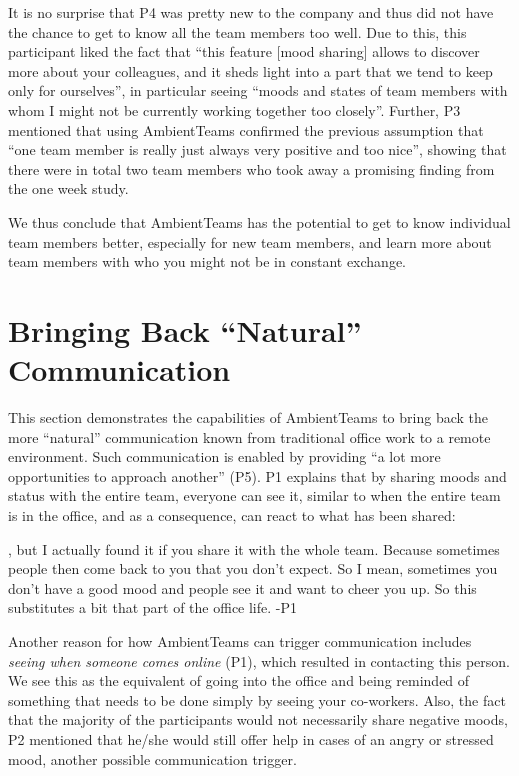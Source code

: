 It is no surprise that P4 was pretty new to the company and thus did not have the chance to get to know all the team members too well. Due to this, this participant liked the fact that \enquote{this feature [mood sharing] allows to discover more about your colleagues, and it sheds light into a part that we tend to keep only for ourselves}, in particular seeing \enquote{moods and states of team members with whom I might not be currently working together too closely}. Further, P3 mentioned that using AmbientTeams confirmed the previous assumption that \enquote{one team member is really just always very positive and too nice}, showing that there were in total two team members who took away a promising finding from the one week study.

We thus conclude that AmbientTeams has the potential to get to know individual team members better, especially for new team members, and learn more about team members with who you might not be in constant exchange.


\section{Bringing Back \enquote{Natural} Communication}
This section demonstrates the capabilities of AmbientTeams to bring back the more \enquote{natural} communication known from traditional office work to a remote environment. Such communication is enabled by providing \enquote{a lot more opportunities to approach another} (P5). P1 explains that by sharing moods and status with the entire team, everyone can see it, similar to when the entire team is in the office, and as a consequence, can react to what has been shared:

\begin{displayquote}[][]
    [...], but I actually found it if you share it with the whole team. Because sometimes people then come back to you that you don't expect. So I mean, sometimes you don't have a good mood and people see it and want to cheer you up. So this substitutes a bit that part of the office life. -P1
\end{displayquote}

Another reason for how AmbientTeams can trigger communication includes \textit{seeing when someone comes online} (P1), which resulted in contacting this person. We see this as the equivalent of going into the office and being reminded of something that needs to be done simply by seeing your co-workers. Also, the fact that the majority of the participants would not necessarily share negative moods, P2 mentioned that he/she would still offer help in cases of an angry or stressed mood, another possible communication trigger.

